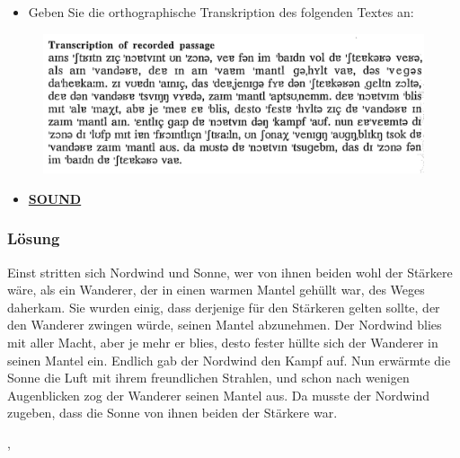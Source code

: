 \begin{frame}

	\begin{itemize}
		\item Geben Sie die orthographische Transkription des folgenden Textes an:		
	\end{itemize}
	
	\begin{figure}[H]
		\includegraphics[scale=0.22]{material/04einststrittentranspompino}		
	\end{figure}
	
	\begin{itemize}
		\item \href{run:material/04einststrittenaudio/04einststritten.wpl}{\textbf{SOUND}}
	\end{itemize}

	
\end{frame}


\begin{frame}
\frametitle{Lösung}

Einst stritten sich Nordwind und Sonne, wer von ihnen beiden wohl der Stärkere wäre, als ein
Wanderer, der in einen warmen Mantel gehüllt war, des Weges daherkam. Sie wurden einig, dass
derjenige für den Stärkeren gelten sollte, der den Wanderer zwingen würde, seinen Mantel
abzunehmen. Der Nordwind blies mit aller Macht, aber je mehr er blies, desto fester hüllte sich der
Wanderer in seinen Mantel ein. Endlich gab der Nordwind den Kampf auf. Nun erwärmte die Sonne die
Luft mit ihrem freundlichen Strahlen, und schon nach wenigen Augenblicken zog der Wanderer seinen
Mantel aus. Da musste der Nordwind zugeben, dass die Sonne von ihnen beiden der Stärkere war.

\citep{Pompino95a}, \citep{Kohler99a}

\end{frame}


